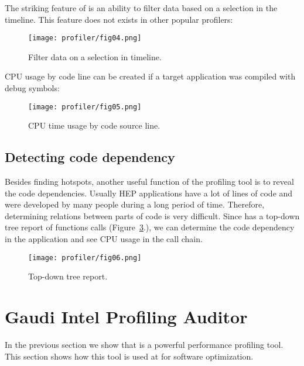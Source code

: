 The striking feature of \amp is an ability to filter data based on a selection
in the timeline. This feature does not exists in other popular profilers:

\begin{figure}[H]
\begin{minipage}{\textwidth}
\texttt{[image: profiler/fig04.png]}
\caption{\label{fig04}Filter data on a selection in timeline.}
\end{minipage}
\end{figure}

CPU usage by code line can be created if a target application was compiled with
debug symbols:

\begin{figure}[H]
\begin{minipage}{\textwidth}
\texttt{[image: profiler/fig05.png]}
\caption{\label{fig05}CPU time usage by code source line.}
\end{minipage}
\end{figure}

\subsection{Detecting code dependency}

Besides finding hotspots, another useful function of the profiling tool is to
reveal the code dependencies. Usually HEP applications have a lot of lines of
code and were developed by many people during a long period of time. Therefore,
determining relations between parts of code is very difficult. Since \amp  has
a top-down tree report of functions calls (Figure~\ref{fig06}.), we can
determine the code dependency in the application and see CPU usage in the call
chain.

\begin{figure}[H]
\begin{minipage}{\textwidth}
\texttt{[image: profiler/fig06.png]}
\caption{\label{fig06}Top-down tree report.}
\end{minipage}
\end{figure}

\section[Profiling Auditor]{Gaudi Intel Profiling Auditor}

In the previous section we show that \iamp is a powerful performance profiling
tool. This section shows how this tool is used at \lhcb
for software optimization.

